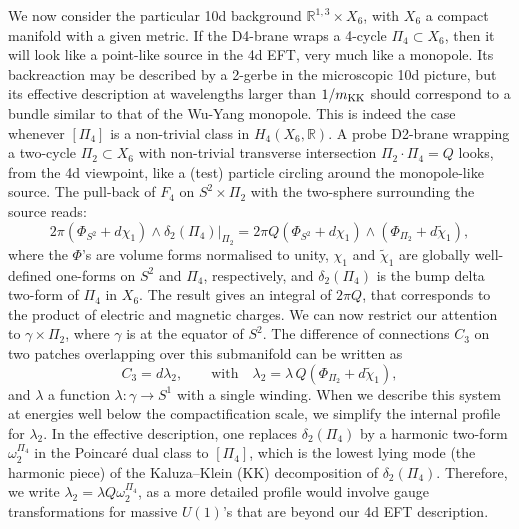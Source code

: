\documentclass[11pt]{article}
\def\be{\begin{equation}}
\def\ee{\end{equation}}
\newcommand{\IR}{\mathbb{R}}
\begin{document}
We now consider the particular 10d background $\IR^{1,3} \times X_6$, with $X_6$ a compact manifold with a given metric.  If the D4-brane wraps a 4-cycle $\Pi_4 \subset X_6$, then it will look like a point-like source in the 4d EFT, very much like a monopole. Its backreaction may be described by a 2-gerbe in the microscopic 10d picture, but its effective description at wavelengths larger than $1/m_{\rm KK}$  should correspond to a bundle similar to that of the Wu-Yang monopole. This is indeed the case whenever $[\Pi_4]$ is a non-trivial class in $H_4 (X_6,\IR)$. A probe D2-brane wrapping a two-cycle $\Pi_{2} \subset X_6$ with non-trivial transverse intersection $ \Pi_2 \cdot \Pi_{4} = Q$ looks, from the 4d viewpoint, like a (test) particle circling around the monopole-like source. The pull-back of $F_{4}$ on $S^2  \times \Pi_{2}$ with the two-sphere surrounding the source reads:
\be
2\pi \left( \Phi_{S^2} + d\chi_1\right) \wedge \delta_2(\Pi_4)|_{\Pi_{2}} = 2\pi Q \left( \Phi_{S^2} + d\chi_1\right) \wedge \left(\Phi_{\Pi_{2}} + d\tilde{\chi}_{1}\right)  ,
\label{pullF84d}
\ee
where the $\Phi$'s are volume forms normalised to unity, $\chi_1$ and $\tilde{\chi}_1$ are globally well-defined one-forms on $S^2$ and $\Pi_4$,  respectively, and $
\delta_2(\Pi_4)$ is the bump delta two-form of $\Pi_4$ in $X_6$. The result gives an integral of $2\pi Q$, that corresponds to the product of electric and magnetic charges. We can now restrict our attention to $\gamma \times \Pi_{2}$, where $\gamma$ is at the equator of $S^2$. The difference of connections $C_{3}$ on two patches overlapping over  this submanifold can be written as  
\be
C_{3} = d\lambda_{2}, \qquad \text{with} \quad \lambda_{2} = \lambda\, Q \left( \Phi_{\Pi_{2}} + d\tilde{\chi}_{1}\right) ,
\label{C3point}
\ee
and $\lambda$ a function $\lambda : \gamma \to S^1$ with a single winding. When we describe this system at energies well below the compactification scale, we simplify the internal profile for $\lambda_{2}$. In the effective description, one replaces $ \delta_2(\Pi_4)$ by a harmonic two-form $\omega_2^{\Pi_4}$ in the Poincar\'e dual class to $[\Pi_4]$, which is the lowest lying mode (the harmonic piece) of the Kaluza--Klein (KK) decomposition of $\delta_2(\Pi_4)$. Therefore, we write $ \lambda_{2} = \lambda Q \omega_2^{\Pi_4}$, as a more detailed profile would involve gauge transformations for massive $U(1)$'s that are beyond our 4d EFT description. 
\end{document}
